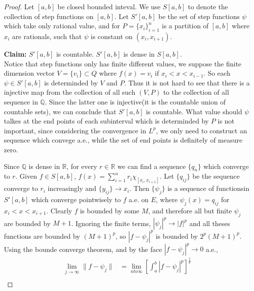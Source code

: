 \documentclass[lang=en, 12pt]{elegantbook}
\newcommand{\RR}{\mathbb{R}}
\newcommand{\QQ}{\mathbb{Q}}
\begin{document}
        \begin{proof}
            Let $[a,b]$ be closed bounded inteval. We use $S[a,b]$ to denote the collection
        of step functions on $[a,b]$. Let $S'[a,b]$ be the set of step functions $\psi$ which take only rational 
        value, and for $P=\{x_i\}_{i=1}^n$ is a partition of $[a,b]$ where $x_i$ are rationals, such 
        that $\psi$ is constant on $(x_i, x_{i+1})$. \par 
            \textbf{Claim:} $S'[a,b]$ is countable. $S'[a,b]$ is dense in $S[a,b]$.\\
            Notice that step functions only has finite different values, we suppose the finite dimension
        vector $V=\{v_i\} \subset Q$ where $f(x) = v_i$ if $x_i < x < x_{i-1}$. So each $\psi \in S'[a,b]$
        is determinded by $V$ and $P$. Thus it is not hard to see that there is a injective 
        map from the collection of all such $(V,P)$ to the collection of all sequence in $\QQ$. Since 
        the latter one is injective(it is the countable union of countable sets), we can conclude that 
        $S'[a,b]$ is countable. What value should $\psi$ talkes at the end points of each 
        subinterval which is determinded by $P$ is not important, since considering the convergence 
        in $L^p$, we only need to construct an sequence which convege a.e., while the set of end 
        points is definitely of measure zero.\par 
            Since $\QQ$ is dense in $\RR$, for every $r \in \RR$ we can find a sequence $\{q_n\}$ which    
        converge  to $r$. Given $f \in S[a,b]$, $f(x) = \sum_{i=1}^n r_i \chi_{[x_i, x_{i+1}]}$.
        Let $\{q_{ij}\}$ be the sequence converge to $r_i$ increasingly and $\{y_{ij}\} \to x_i$. 
        Then $\{\psi_j\}$ is a sequence of functionsin $S'[a,b]$ which converge pointwisely to $f$ a.e. on $E$, 
        where $\psi_j(x) = q_{ij}$ for $x_i< x <x_{i+1}$. Clearly $f$ is bounded by some $M$, and therefore
        all but finite $\psi_j$ are bounded by $M+1$. Ignoring the finite terms, $|\psi_j|^p \to |f|^p$ 
        and all theses functions are bounded by $(M+1)^p$, so $|f-\psi_j|^p$ is bounded by $2^p(M+1)^p$. 
        Using the bounde converge theorem, and by the face $|f-\psi_j|^p \to 0$ a.e.,
        \begin{equation*}
            \begin{aligned}
                \lim_{j \to \infty}\lVert f - \psi_j \rVert &= \lim_{n to \infty} 
                [\int_a^b |f-\psi_j|^p]^{\frac{1}{p}} \\

\end{aligned}
\end{equation*}
\end{proof}
\end{document}
